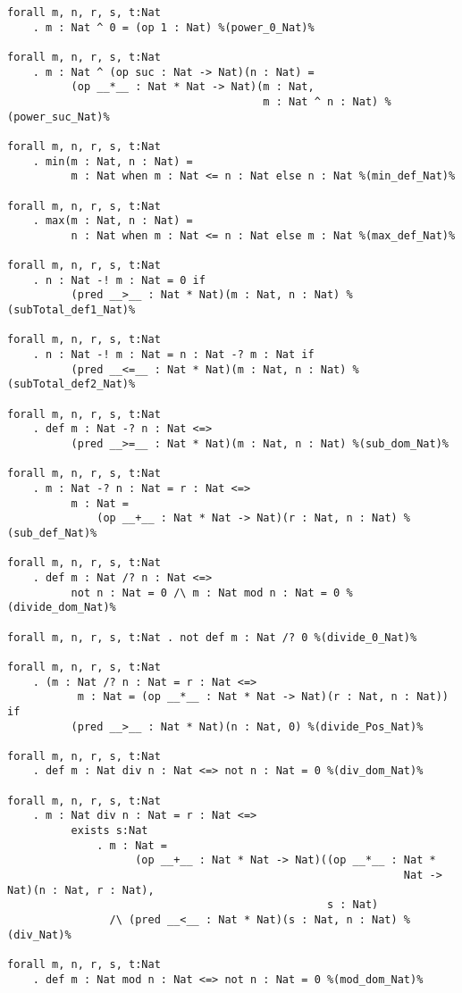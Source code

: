 \documentclass[11pt,a4paper]{article}
\begin{document}
\begin{verbatim}
forall m, n, r, s, t:Nat
    . m : Nat ^ 0 = (op 1 : Nat) %(power_0_Nat)%

forall m, n, r, s, t:Nat
    . m : Nat ^ (op suc : Nat -> Nat)(n : Nat) =
          (op __*__ : Nat * Nat -> Nat)(m : Nat,
                                        m : Nat ^ n : Nat) %(power_suc_Nat)%

forall m, n, r, s, t:Nat
    . min(m : Nat, n : Nat) =
          m : Nat when m : Nat <= n : Nat else n : Nat %(min_def_Nat)%

forall m, n, r, s, t:Nat
    . max(m : Nat, n : Nat) =
          n : Nat when m : Nat <= n : Nat else m : Nat %(max_def_Nat)%

forall m, n, r, s, t:Nat
    . n : Nat -! m : Nat = 0 if
          (pred __>__ : Nat * Nat)(m : Nat, n : Nat) %(subTotal_def1_Nat)%

forall m, n, r, s, t:Nat
    . n : Nat -! m : Nat = n : Nat -? m : Nat if
          (pred __<=__ : Nat * Nat)(m : Nat, n : Nat) %(subTotal_def2_Nat)%

forall m, n, r, s, t:Nat
    . def m : Nat -? n : Nat <=>
          (pred __>=__ : Nat * Nat)(m : Nat, n : Nat) %(sub_dom_Nat)%

forall m, n, r, s, t:Nat
    . m : Nat -? n : Nat = r : Nat <=>
          m : Nat =
              (op __+__ : Nat * Nat -> Nat)(r : Nat, n : Nat) %(sub_def_Nat)%

forall m, n, r, s, t:Nat
    . def m : Nat /? n : Nat <=>
          not n : Nat = 0 /\ m : Nat mod n : Nat = 0 %(divide_dom_Nat)%

forall m, n, r, s, t:Nat . not def m : Nat /? 0 %(divide_0_Nat)%

forall m, n, r, s, t:Nat
    . (m : Nat /? n : Nat = r : Nat <=>
           m : Nat = (op __*__ : Nat * Nat -> Nat)(r : Nat, n : Nat)) if
          (pred __>__ : Nat * Nat)(n : Nat, 0) %(divide_Pos_Nat)%

forall m, n, r, s, t:Nat
    . def m : Nat div n : Nat <=> not n : Nat = 0 %(div_dom_Nat)%

forall m, n, r, s, t:Nat
    . m : Nat div n : Nat = r : Nat <=>
          exists s:Nat
              . m : Nat =
                    (op __+__ : Nat * Nat -> Nat)((op __*__ : Nat *
                                                              Nat -> Nat)(n : Nat, r : Nat),
                                                  s : Nat)
                /\ (pred __<__ : Nat * Nat)(s : Nat, n : Nat) %(div_Nat)%

forall m, n, r, s, t:Nat
    . def m : Nat mod n : Nat <=> not n : Nat = 0 %(mod_dom_Nat)%


\end{verbatim}
\end{document}
